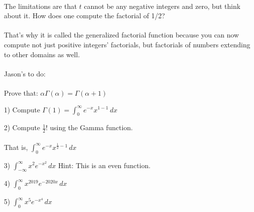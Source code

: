 \documentclass[11pt]{article}
\begin{document}
\\ {The limitations are that } ${t}$ { cannot be any negative integers and zero, but think about it. How does one compute the factorial of 1/2?} \\
\\ {That's why it is called the generalized factorial function because you can now compute not just positive integers' factorials, but factorials of numbers extending to other domains as well.} \\ 
\\ {Jason's to do:} \\
\\ {Prove that: } ${\alpha\Gamma(\alpha) = \Gamma(\alpha + 1)}$
\newpage

1) {Compute } ${\displaystyle \Gamma(1) = \int_{0}^{\infty} e^{-x}x^{1-1} \,dx }$ 
\newpage

2)  {Compute } ${\frac{1}{2}!}$ {using the Gamma function.} \\
\\ {That is, } ${\displaystyle \int_{0}^{\infty} e^{-x}x^{\frac{1}{2}-1} \,dx}$ \\
\newpage

3) ${\displaystyle \int_{-\infty}^{\infty} x^{2} e^{-x^2} \,dx }$ { Hint: This is an even function.}
\newpage

4) ${\displaystyle \int_{0}^{\infty} x^{2019} e^{-2020x} \,dx}$
\newpage

5) ${\displaystyle \int_{0}^{\infty} x^{5} e^{-x^{4}} \,dx}$
\end{document}
